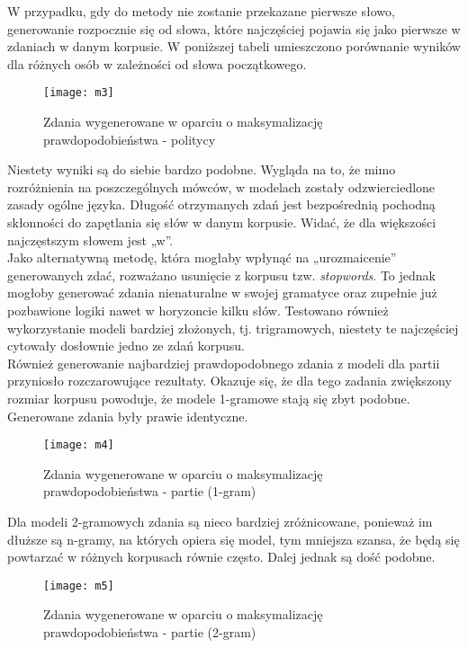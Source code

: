 \documentclass[a4paper,11pt,twoside]{report}
\theoremstyle{definition}
\begin{document}
W przypadku, gdy do metody nie zostanie przekazane pierwsze słowo, generowanie rozpocznie się od słowa, które najczęściej pojawia się jako pierwsze w zdaniach w danym korpusie. W poniższej tabeli umieszczono porównanie wyników dla różnych osób w zależności od słowa początkowego.\\

\begin{figure}[h] 
\texttt{[image: m3]} 
\centering \caption{Zdania wygenerowane w oparciu o maksymalizację prawdopodobieństwa - politycy}
\end{figure}

Niestety wyniki są do siebie bardzo podobne. Wygląda na to, że mimo rozróżnienia na poszczególnych mówców, w modelach zostały odzwierciedlone zasady ogólne języka. 
Długość otrzymanych zdań jest bezpośrednią pochodną skłonności do zapętlania się słów w danym korpusie. Widać, że dla większości najczęstszym słowem jest „w”.\\
Jako alternatywną metodę, która mogłaby wpłynąć na „urozmaicenie” generowanych zdać, rozważano usunięcie z korpusu tzw. \textit{stopwords}. To jednak mogłoby generować zdania nienaturalne w swojej gramatyce oraz zupełnie już pozbawione logiki nawet w horyzoncie kilku słów. Testowano również wykorzystanie modeli bardziej złożonych, tj. trigramowych, niestety te najczęściej cytowały dosłownie jedno ze zdań korpusu.\\
Również generowanie najbardziej prawdopodobnego zdania z modeli dla partii przyniosło rozczarowujące rezultaty. Okazuje się, że dla tego zadania zwiększony rozmiar korpusu powoduje, że modele 1-gramowe stają się zbyt podobne. Generowane zdania były prawie identyczne. \\

\begin{figure}[h] 
\texttt{[image: m4]} 
\centering \caption{Zdania wygenerowane w oparciu o maksymalizację prawdopodobieństwa - partie (1-gram)}
\end{figure}

Dla modeli 2-gramowych zdania są nieco bardziej zróżnicowane, ponieważ im dłuższe są n-gramy, na których opiera się model, tym mniejsza szansa, że będą się powtarzać w różnych korpusach równie często. Dalej jednak są dość podobne. \\
\begin{figure}[!ht] 
\texttt{[image: m5]} 
\centering \caption{Zdania wygenerowane w oparciu o maksymalizację prawdopodobieństwa - partie (2-gram)}
\end{figure}
\end{document}
